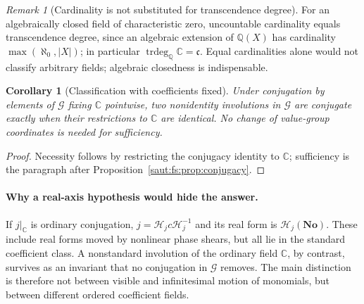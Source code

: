 \documentclass[11pt]{article}
\newtheorem{corollary}[theorem]{Corollary}
\theoremstyle{definition}
\theoremstyle{remark}
\newtheorem{remark}[theorem]{Remark}
\newcommand{\No}{\mathbf{No}}
\newcommand{\C}{\mathbb C}
\newcommand{\Q}{\mathbb Q}
\newcommand{\abs}[1]{\lvert#1\rvert}
\newcommand{\trdeg}{\operatorname{trdeg}}
\newcommand{\cc}{\mathfrak c}
\numberwithin{equation}{section}
\begin{document}
\begin{remark}[Cardinality is not substituted for transcendence degree]\label{saut:gr:rem:trdeg}
For an algebraically closed field of characteristic zero, uncountable cardinality
equals transcendence degree, since an algebraic extension of $\Q(X)$ has cardinality
$\max(\aleph_0,\abs X)$; in particular $\trdeg_\Q\C=\cc$. Equal cardinalities alone would
not classify arbitrary fields; algebraic closedness is indispensable.
\end{remark}

\begin{corollary}[Classification with coefficients fixed]\label{saut:gr:cor:fixedcoeff}
Under conjugation by elements of $\mathcal G$ fixing $\C$ pointwise, two nonidentity
involutions in $\mathcal G$ are conjugate exactly when their restrictions to $\C$ are
identical. No change of value-group coordinates is needed for sufficiency.
\end{corollary}
\begin{proof}
Necessity follows by restricting the conjugacy identity to $\C$; sufficiency is the
paragraph after Proposition~\ref{saut:fs:prop:conjugacy}.
\end{proof}

\paragraph{Why a real-axis hypothesis would hide the answer.} If $j|_\C$ is ordinary
conjugation, $j=\mathcal H_jc\mathcal H_j^{-1}$ and its real form is $\mathcal H_j(\No)$.
These include real forms moved by nonlinear phase shears, but all lie in the standard
coefficient class. A nonstandard involution of the ordinary field $\C$, by contrast,
survives as an invariant that no conjugation in $\mathcal G$ removes. The main
distinction is therefore not between visible and infinitesimal motion of monomials,
but between different ordered coefficient fields.
\end{document}
